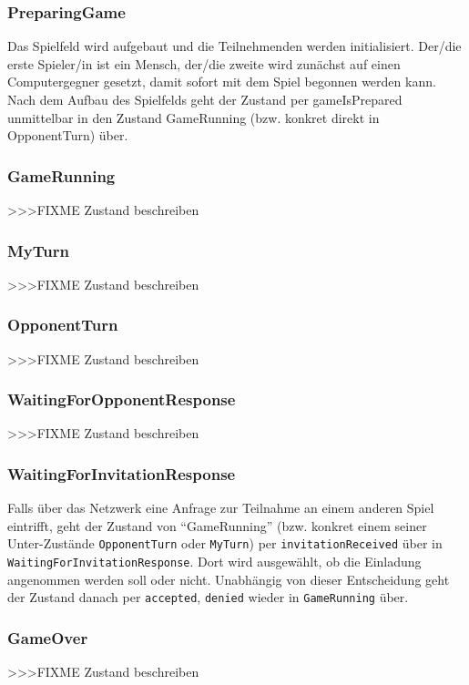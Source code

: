 \documentclass[a4paper, 10pt, fleqn]{article}
\begin{document}
\subsubsection*{PreparingGame}
Das Spielfeld wird aufgebaut und die Teilnehmenden werden initialisiert. 
Der/die erste Spieler/in ist ein Mensch, der/die zweite wird zunächst auf 
einen Computergegner gesetzt, damit sofort mit dem Spiel begonnen werden kann. 
Nach dem Aufbau des Spielfelds geht der Zustand per gameIsPrepared unmittelbar 
in den Zustand GameRunning (bzw. konkret direkt in OpponentTurn) über.

\subsubsection*{GameRunning}
>>>FIXME Zustand beschreiben

\subsubsection*{MyTurn}
>>>FIXME Zustand beschreiben

\subsubsection*{OpponentTurn}
>>>FIXME Zustand beschreiben

\subsubsection*{WaitingForOpponentResponse}
>>>FIXME Zustand beschreiben

\subsubsection*{WaitingForInvitationResponse}
Falls über das Netzwerk eine Anfrage zur Teilnahme an einem anderen Spiel 
eintrifft, geht der Zustand von “GameRunning” (bzw. konkret einem seiner 
Unter-Zustände \verb?OpponentTurn? oder \verb?MyTurn?) per 
\verb?invitationReceived? über in \verb?WaitingForInvitationResponse?. Dort 
wird ausgewählt, ob die Einladung angenommen werden soll oder nicht. 
Unabhängig von dieser Entscheidung geht der Zustand danach per 
\verb?accepted?, \verb?denied? wieder in \verb?GameRunning? über.

\subsubsection*{GameOver}
>>>FIXME Zustand beschreiben
\end{document}
